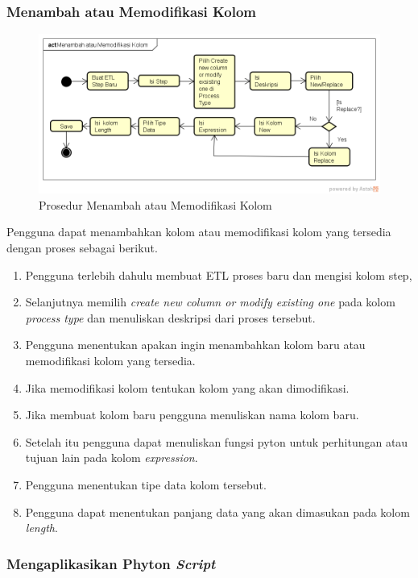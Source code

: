 \subsubsection{Menambah atau Memodifikasi Kolom}
	\begin{figure}[H]
	\centering
	\includegraphics[scale=0.5]{Gambar/Menambah-atau-Memodifikasi-Kolom}
	\caption{Prosedur Menambah atau Memodifikasi Kolom}
	\end{figure}

	Pengguna dapat menambahkan kolom atau memodifikasi kolom yang tersedia dengan proses sebagai berikut.
	\begin{enumerate}
		\item Pengguna terlebih dahulu membuat ETL proses baru dan mengisi kolom step,
		\item Selanjutnya memilih \textit{create new column or modify existing one} pada kolom \textit{process type} dan menuliskan deskripsi dari proses tersebut.
		\item Pengguna menentukan apakan ingin menambahkan kolom baru atau memodifikasi kolom yang tersedia.
		\item Jika memodifikasi kolom tentukan kolom yang akan dimodifikasi.
		\item Jika membuat kolom baru pengguna menuliskan nama kolom baru.
		\item Setelah itu pengguna dapat menuliskan fungsi pyton untuk perhitungan atau tujuan lain pada kolom \textit{expression}.
		\item Pengguna menentukan tipe data kolom tersebut.
		\item Pengguna dapat menentukan panjang data yang akan dimasukan pada kolom \textit{length}.
		
	\end{enumerate}
	
\subsubsection{Mengaplikasikan Phyton \textit{Script}}

